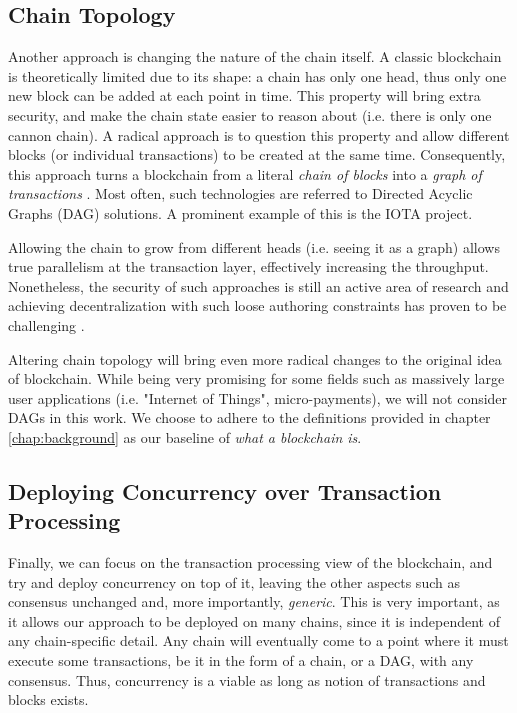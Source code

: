\subsection{Chain Topology}

Another approach is changing the nature of the chain itself. A classic blockchain is theoretically
limited due to its shape: a chain has only one head, thus only one new block can be added at each
point in time. This property will bring extra security, and make the chain state easier to reason
about (i.e. there is only one cannon chain). A radical approach is to question this property and
allow different blocks (or individual transactions) to be created at the same time. Consequently,
this approach turns a blockchain from a literal \textit{chain of blocks} into a \textit{graph of
transactions} \cite{pervezComparativeAnalysisDAGBased2018}. Most often, such technologies are
referred to Directed Acyclic Graphs (DAG) solutions. A prominent example of this is the IOTA
project\cite{mIOTANextGenerationBlock2018}.

Allowing the chain to grow from different heads (i.e. seeing it as a graph) allows true parallelism
at the transaction layer, effectively increasing the throughput. Nonetheless, the security of such
approaches is still an active area of research and achieving decentralization with such loose
authoring constraints has proven to be challenging \cite{sompolinskySPECTREFastScalable2016}.

Altering chain topology will bring even more radical changes to the original idea of blockchain.
While being very promising for some fields such as massively large user applications (i.e. "Internet
of Things", micro-payments), we will not consider DAGs in this work. We choose to adhere to the
definitions provided in chapter \ref{chap:background} as our baseline of \textit{what a blockchain
is}.

\subsection{Deploying Concurrency over Transaction Processing}
\label{chap_approach:subsec:out_of_box_concurrency}

Finally, we can focus on the transaction processing view of the blockchain, and try and deploy
concurrency on top of it, leaving the other aspects such as consensus unchanged and, more
importantly, \textit{generic}. This is very important, as it allows our approach to be deployed on
many chains, since it is independent of any chain-specific detail. Any chain will eventually come to
a point where it must execute some transactions, be it in the form of a chain, or a DAG, with any
consensus. Thus, concurrency is a viable as long as notion of transactions and blocks exists.

